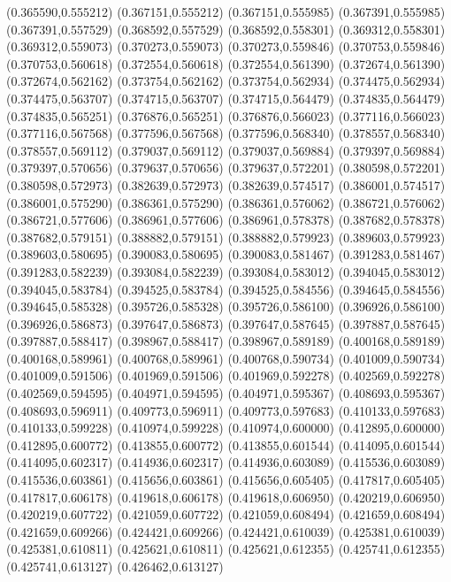 (0.365590,0.555212)
(0.367151,0.555212)
(0.367151,0.555985)
(0.367391,0.555985)
(0.367391,0.557529)
(0.368592,0.557529)
(0.368592,0.558301)
(0.369312,0.558301)
(0.369312,0.559073)
(0.370273,0.559073)
(0.370273,0.559846)
(0.370753,0.559846)
(0.370753,0.560618)
(0.372554,0.560618)
(0.372554,0.561390)
(0.372674,0.561390)
(0.372674,0.562162)
(0.373754,0.562162)
(0.373754,0.562934)
(0.374475,0.562934)
(0.374475,0.563707)
(0.374715,0.563707)
(0.374715,0.564479)
(0.374835,0.564479)
(0.374835,0.565251)
(0.376876,0.565251)
(0.376876,0.566023)
(0.377116,0.566023)
(0.377116,0.567568)
(0.377596,0.567568)
(0.377596,0.568340)
(0.378557,0.568340)
(0.378557,0.569112)
(0.379037,0.569112)
(0.379037,0.569884)
(0.379397,0.569884)
(0.379397,0.570656)
(0.379637,0.570656)
(0.379637,0.572201)
(0.380598,0.572201)
(0.380598,0.572973)
(0.382639,0.572973)
(0.382639,0.574517)
(0.386001,0.574517)
(0.386001,0.575290)
(0.386361,0.575290)
(0.386361,0.576062)
(0.386721,0.576062)
(0.386721,0.577606)
(0.386961,0.577606)
(0.386961,0.578378)
(0.387682,0.578378)
(0.387682,0.579151)
(0.388882,0.579151)
(0.388882,0.579923)
(0.389603,0.579923)
(0.389603,0.580695)
(0.390083,0.580695)
(0.390083,0.581467)
(0.391283,0.581467)
(0.391283,0.582239)
(0.393084,0.582239)
(0.393084,0.583012)
(0.394045,0.583012)
(0.394045,0.583784)
(0.394525,0.583784)
(0.394525,0.584556)
(0.394645,0.584556)
(0.394645,0.585328)
(0.395726,0.585328)
(0.395726,0.586100)
(0.396926,0.586100)
(0.396926,0.586873)
(0.397647,0.586873)
(0.397647,0.587645)
(0.397887,0.587645)
(0.397887,0.588417)
(0.398967,0.588417)
(0.398967,0.589189)
(0.400168,0.589189)
(0.400168,0.589961)
(0.400768,0.589961)
(0.400768,0.590734)
(0.401009,0.590734)
(0.401009,0.591506)
(0.401969,0.591506)
(0.401969,0.592278)
(0.402569,0.592278)
(0.402569,0.594595)
(0.404971,0.594595)
(0.404971,0.595367)
(0.408693,0.595367)
(0.408693,0.596911)
(0.409773,0.596911)
(0.409773,0.597683)
(0.410133,0.597683)
(0.410133,0.599228)
(0.410974,0.599228)
(0.410974,0.600000)
(0.412895,0.600000)
(0.412895,0.600772)
(0.413855,0.600772)
(0.413855,0.601544)
(0.414095,0.601544)
(0.414095,0.602317)
(0.414936,0.602317)
(0.414936,0.603089)
(0.415536,0.603089)
(0.415536,0.603861)
(0.415656,0.603861)
(0.415656,0.605405)
(0.417817,0.605405)
(0.417817,0.606178)
(0.419618,0.606178)
(0.419618,0.606950)
(0.420219,0.606950)
(0.420219,0.607722)
(0.421059,0.607722)
(0.421059,0.608494)
(0.421659,0.608494)
(0.421659,0.609266)
(0.424421,0.609266)
(0.424421,0.610039)
(0.425381,0.610039)
(0.425381,0.610811)
(0.425621,0.610811)
(0.425621,0.612355)
(0.425741,0.612355)
(0.425741,0.613127)
(0.426462,0.613127)
